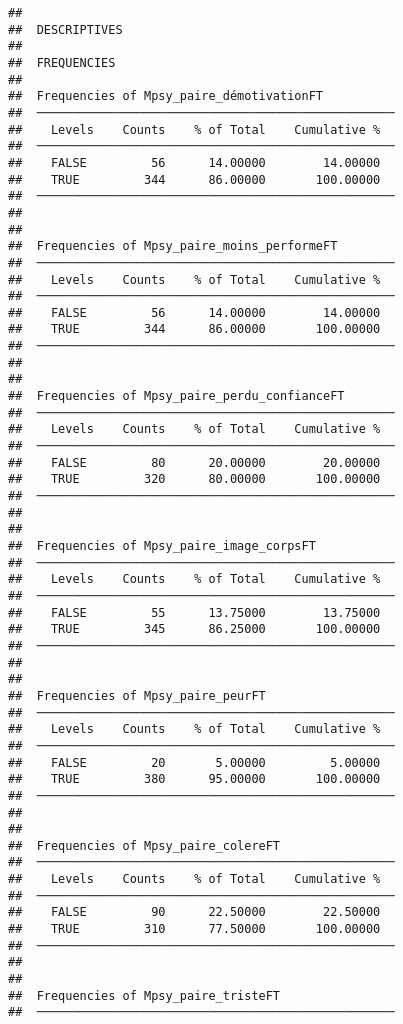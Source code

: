 \documentclass[
]{article}
\begin{document}
\begin{verbatim}
## 
##  DESCRIPTIVES
## 
##  FREQUENCIES
## 
##  Frequencies of Mpsy_paire_démotivationFT           
##  ────────────────────────────────────────────────── 
##    Levels    Counts    % of Total    Cumulative %   
##  ────────────────────────────────────────────────── 
##    FALSE         56      14.00000        14.00000   
##    TRUE         344      86.00000       100.00000   
##  ────────────────────────────────────────────────── 
## 
## 
##  Frequencies of Mpsy_paire_moins_performeFT         
##  ────────────────────────────────────────────────── 
##    Levels    Counts    % of Total    Cumulative %   
##  ────────────────────────────────────────────────── 
##    FALSE         56      14.00000        14.00000   
##    TRUE         344      86.00000       100.00000   
##  ────────────────────────────────────────────────── 
## 
## 
##  Frequencies of Mpsy_paire_perdu_confianceFT        
##  ────────────────────────────────────────────────── 
##    Levels    Counts    % of Total    Cumulative %   
##  ────────────────────────────────────────────────── 
##    FALSE         80      20.00000        20.00000   
##    TRUE         320      80.00000       100.00000   
##  ────────────────────────────────────────────────── 
## 
## 
##  Frequencies of Mpsy_paire_image_corpsFT            
##  ────────────────────────────────────────────────── 
##    Levels    Counts    % of Total    Cumulative %   
##  ────────────────────────────────────────────────── 
##    FALSE         55      13.75000        13.75000   
##    TRUE         345      86.25000       100.00000   
##  ────────────────────────────────────────────────── 
## 
## 
##  Frequencies of Mpsy_paire_peurFT                   
##  ────────────────────────────────────────────────── 
##    Levels    Counts    % of Total    Cumulative %   
##  ────────────────────────────────────────────────── 
##    FALSE         20       5.00000         5.00000   
##    TRUE         380      95.00000       100.00000   
##  ────────────────────────────────────────────────── 
## 
## 
##  Frequencies of Mpsy_paire_colereFT                 
##  ────────────────────────────────────────────────── 
##    Levels    Counts    % of Total    Cumulative %   
##  ────────────────────────────────────────────────── 
##    FALSE         90      22.50000        22.50000   
##    TRUE         310      77.50000       100.00000   
##  ────────────────────────────────────────────────── 
## 
## 
##  Frequencies of Mpsy_paire_tristeFT                 
##  ────────────────────────────────────────────────── 

\end{verbatim}
\end{document}
